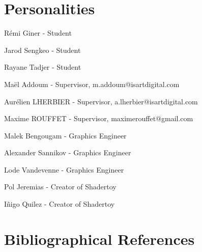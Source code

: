 \documentclass{rapportCS}
\begin{document}
\section*{Personalities}

Rémi Giner - Student

Jarod Sengkeo - Student

Rayane Tadjer - Student

Maël Addoum - Supervisor, m.addoum@isartdigital.com

Aurélien LHERBIER - Supervisor, a.lherbier@isartdigital.com

Maxime ROUFFET - Supervisor, maximerouffet@gmail.com

Malek Bengougam - Graphics Engineer

Alexander Sannikov - Graphics Engineer

Lode Vandevenne - Graphics Engineer

Pol Jeremias - Creator of Shadertoy

Iñigo Quilez - Creator of Shadertoy




\section*{Bibliographical References}



\newpage
\end{document}
